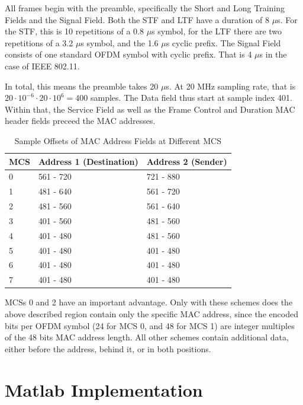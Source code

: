 All frames begin with the preamble, specifically the Short and Long Training Fields and the Signal Field. Both the STF and LTF have a duration of 8 $\mu$s. For the STF, this is 10 repetitions of a 0.8 $\mu$s symbol, for the LTF there are two repetitions of a 3.2 $\mu$s symbol, and the 1.6 $\mu$s cyclic prefix. The Signal Field consists of one standard \gls{OFDM} symbol with cyclic prefix. That is 4 $\mu$s in the case of IEEE 802.11.

In total, this means the preamble takes 20 $\mu$s. At 20 MHz sampling rate, that is $ 20 \cdot 10^{-6} \cdot 20 \cdot 10^6 = 400 $ samples. The Data field thus start at sample index 401. Within that, the Service Field as well as the Frame Control and Duration MAC header fields preceed the MAC addresses.\\

\begin{table}[ht]
	\centering
	\begin{tabular}{|p{2.5cm}|p{4.5cm}|p{4.5cm}|}
		\hline
		\textbf{MCS} & \textbf{Address 1 (Destination)} & \textbf{Address 2 (Sender)} \\ \hline
		0 & 561 - 720 & 721 - 880 \\ \hline
		1 & 481 - 640 & 561 - 720 \\ \hline
		2 & 481 - 560 & 561 - 640 \\ \hline
		3 & 401 - 560 & 481 - 560 \\ \hline
		4 & 401 - 480 & 481 - 560 \\ \hline
		5 & 401 - 480 & 401 - 480 \\ \hline
		6 & 401 - 480 & 401 - 480 \\ \hline
		7 & 401 - 480 & 401 - 480 \\ \hline
	\end{tabular}
	\caption{Sample Offsets of MAC Address Fields at Different MCS}
	\label{tbl:sample-offsets}
\end{table}

\glspl{MCS} 0 and 2 have an important advantage. Only with these schemes does the above described region contain only the specific MAC address, since the encoded bits per OFDM symbol (24 for MCS 0, and 48 for MCS 1) are integer multiples of the 48 bits MAC address length. All other schemes contain additional data, either before the address, behind it, or in both positions.



\section{Matlab Implementation}\label{sec:matlab-impl}

